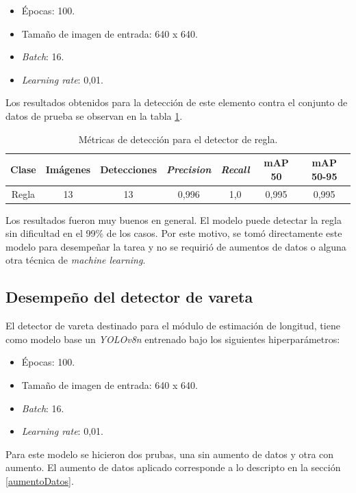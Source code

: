 \begin{itemize}
	\item Épocas: 100.
    \item Tamaño de imagen de entrada: 640 x 640.
    \item \textit{Batch}: 16.
    \item \textit{Learning rate}: 0,01.
\end{itemize}

Los resultados obtenidos para la detección de este elemento contra el conjunto de datos de prueba se observan en la tabla \ref{tab:resultadosRegla}.

\begin{table}[h]
	\centering
	\caption{Métricas de detección para el detector de regla.}
	\begin{tabular}{c c c c c c c}    
		\toprule
		\textbf{Clase}&\textbf{Imágenes}&\textbf{Detecciones}&\textbf{\textit{Precision}} &\textbf{\textit{Recall}}&\textbf{mAP 50}&\textbf{mAP 50-95}\\
		\midrule
		Regla & 13 & 13 & 0,996 & 1,0 & 0,995 & 0,995\\		
		\bottomrule
		\hline
	\end{tabular}
	\label{tab:resultadosRegla}
\end{table}

Los resultados fueron muy buenos en general. El modelo puede detectar la regla sin dificultad en el 99\% de los casos. Por este motivo, se tomó directamente este modelo para desempeñar la tarea y no se requirió de aumentos de datos o alguna otra técnica de \textit{machine learning}.

\subsection{Desempeño del detector de vareta}

El detector de vareta destinado para el módulo de estimación de longitud, tiene como modelo base un \textit{YOLOv8n} entrenado bajo los siguientes hiperparámetros:

\begin{itemize}
	\item Épocas: 100.
    \item Tamaño de imagen de entrada: 640 x 640.
    \item \textit{Batch}: 16.
    \item \textit{Learning rate}: 0,01.
\end{itemize}

Para este modelo se hicieron dos prubas, una sin aumento de datos y otra con aumento. El aumento de datos aplicado corresponde a lo descripto en la sección \ref{aumentoDatos}.

